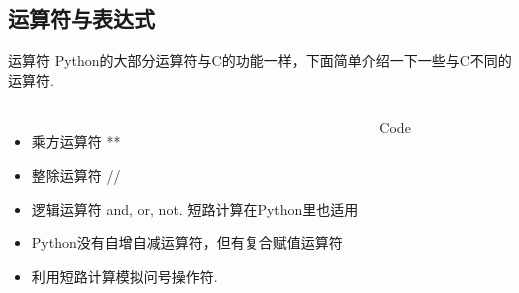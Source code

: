 \documentclass[xcolor=dvipsnames, 9pt]{beamer}
\newenvironment{code}{\begin{semiverbatim} \begin{footnotesize}}{\end{footnotesize}\end{semiverbatim}}
\begin{document}
\subsection{运算符与表达式}
\begin{frame}[fragile]{运算符}
	Python的大部分运算符与C的功能一样，下面简单介绍一下一些与C不同的运算符.
	\begin{columns}
		\begin{itemize}
			\item<2-> 乘方运算符 **
				\vspace{0.1cm}
			\item<4-> 整除运算符 //
				\vspace{0.1cm}
			\item<6-> 逻辑运算符 and, or, not. 短路计算在Python里也适用
				\vspace{0.1cm}
			\item<8-> Python没有自增自减运算符，但有复合赋值运算符
				\vspace{0.1cm}
			\item<10-> 利用短路计算模拟问号操作符. \uncover<11->{\alert<11->{有缺陷！}}
		\end{itemize}
		\begin{block}{Code} \begin{code}




		\end{code}\end{block}
	\end{columns}
\end{frame}
\end{document}

